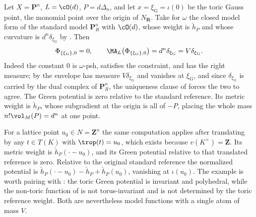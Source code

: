 \begin{example}
\label{ex:ch31-toric-green}
Let $X=\mathbf P^n$, $L=\cO(d)$, $P=d\Delta_n$, and let
$x=\xi_{\mathrm G}=\iota(0)$ be the toric Gauss point, the monomial point
over the origin of $N_{\mathbf R}$.  Take for $\omega$ the closed model
form of the standard model $\mathbf P^n_R$ with $\cO(d)$, whose weight
is $\check h_P$ and whose curvature is $d^n\delta_{\xi_{\mathrm G}}$ by
.  Then
\begin{equation}
\label{eq:ch31-toric-green}
 \Phi_{\{\xi_{\mathrm G}\},0}=0,
 \qquad
 \MA_L\bigl(\Phi_{\{\xi_{\mathrm G}\},0}\bigr)
  =d^n\delta_{\xi_{\mathrm G}}=V\delta_{\xi_{\mathrm G}} .
\end{equation}
Indeed the constant $0$ is $\omega$-psh, satisfies the constraint, and
has the right measure; by  the envelope has measure
$V\delta_{\xi_{\mathrm G}}$ and vanishes at $\xi_{\mathrm G}$, and since
$\delta_{\xi_{\mathrm G}}$ is carried by the dual complex of
$\mathbf P^n_R$, the uniqueness clause of 
forces the two to agree.  The Green potential is zero relative to the
standard reference.  Its metric weight is $\check h_P$, whose subgradient
at the origin is all of $-P$, placing the whole mass
$n!\vol_M(P)=d^n$ at one point.

For a lattice point $u_0\in N=\mathbf Z^n$ the same computation applies
after translating by any $t\in T(K)$ with $\trop(t)=u_0$, which exists
because $v(K^\times)=\mathbf Z$.  Its metric weight is
$\check h_P(\cdot-u_0)$, and its Green potential relative to that
translated reference is zero.  Relative to the original standard reference
the normalized potential is
$\check h_P(\cdot-u_0)-\check h_P+\check h_P(u_0)$, vanishing at
$\iota(u_0)$.  The example is worth pairing with
: the toric Green potential is invariant and
polyhedral, while
the non-toric function of  is not torus-invariant
and is not determined by the toric reference weight.  Both are nevertheless
model functions with a single atom of mass $V$.
\end{example}

